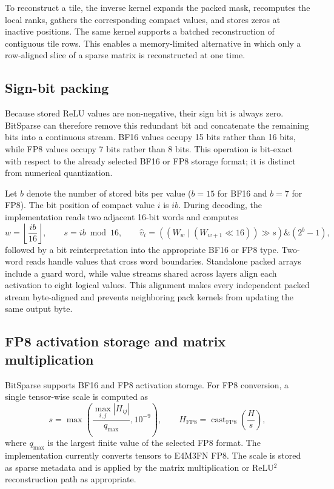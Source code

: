 To reconstruct a tile, the inverse kernel expands the packed mask, recomputes
the local ranks, gathers the corresponding compact values, and stores zeros
at inactive positions.  The same kernel supports a batched reconstruction of
contiguous tile rows.  This enables a memory-limited alternative in which
only a row-aligned slice of a sparse matrix is reconstructed at one time.

\subsection{Sign-bit packing}
\label{sec:method-packing}

Because stored ReLU values are non-negative, their sign bit is always zero.
BitSparse can therefore remove this redundant bit and concatenate the
remaining bits into a continuous stream.  BF16 values occupy 15 bits rather
than 16 bits, while FP8 values occupy 7 bits rather than 8 bits.  This
operation is bit-exact with respect to the already selected BF16 or FP8
storage format; it is distinct from numerical quantization.

Let $b$ denote the number of stored bits per value ($b=15$ for BF16 and
$b=7$ for FP8).  The bit position of compact value $i$ is $ib$.  During
decoding, the implementation reads two adjacent 16-bit words and computes
\begin{equation}
    w = \left\lfloor \frac{ib}{16} \right\rfloor,
    \qquad
    s = ib \bmod 16,
    \qquad
    \hat{v}_i =
    \left((W_w \mathbin{|} (W_{w+1} \ll 16)) \gg s\right)
    \mathbin{\&} (2^b-1),
\end{equation}
followed by a bit reinterpretation into the appropriate BF16 or FP8 type.
Two-word reads handle values that cross word boundaries.  Standalone packed
arrays include a guard word, while value streams shared across layers align
each activation to eight logical values.  This alignment makes every
independent packed stream byte-aligned and prevents neighboring pack kernels
from updating the same output byte.

\subsection{FP8 activation storage and matrix multiplication}
\label{sec:method-fp8}

BitSparse supports BF16 and FP8 activation storage.  For FP8 conversion, a
single tensor-wise scale is computed as
\begin{equation}
    s = \max\left(
        \frac{\max_{i,j}|H_{ij}|}{q_{\max}},
        10^{-9}
    \right),
    \qquad
    H_{\mathrm{FP8}} =
    \operatorname{cast}_{\mathrm{FP8}}\left(\frac{H}{s}\right),
    \label{eq:fp8-scale}
\end{equation}
where $q_{\max}$ is the largest finite value of the selected FP8 format.
The implementation currently converts tensors to E4M3FN FP8.  The scale is
stored as sparse metadata and is applied by the matrix multiplication or
ReLU$^2$ reconstruction path as appropriate.

